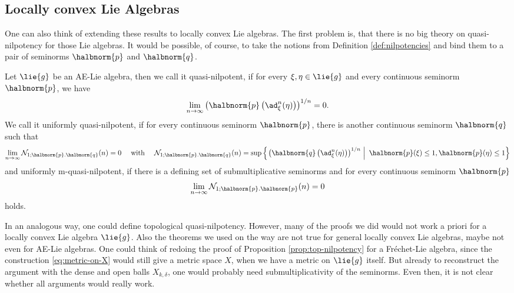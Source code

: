 \documentclass[
11pt,                          %
english                        %
]{article}
\begin{document}
\subsection{Locally convex Lie Algebras}
One can also think of extending these results to locally convex Lie algebras. The 
first problem is, that there is no big theory on quasi-nilpotency for those Lie 
algebras. It would be possible, of course, to take the notions from Definition 
\ref{def:nilpotencies} and bind them to a pair of seminorms $\halbnorm{p}$ and 
$\halbnorm{q}$.
\begin{definition}
	Let $\lie{g}$ be an AE-Lie algebra, then we call it quasi-nilpotent, if for 
	every $\xi, \eta \in \lie{g}$ and every continuous seminorm $\halbnorm{p}$,
	we have
	\begin{equation}
		\lim\limits_{n \rightarrow \infty}
		\left(
			\halbnorm{p}
			\left(
				\ad_\xi^n(\eta)
			\right)
		\right)^{1/n}
		=
		0.
	\end{equation}
	We call it uniformly quasi-nilpotent, if for every continuous seminorm 
	$\halbnorm{p}$, there is another continuous seminorm $\halbnorm{q}$ such that 
	\begin{equation}
		\lim\limits_{n \rightarrow \infty}
		\mathcal{N}_{1; \halbnorm{p}. \halbnorm{q}}(n)
		=
		0
		\quad \text{ with } \quad
		\mathcal{N}_{1; \halbnorm{p}. \halbnorm{q}}(n)
		=
		\sup
		\left\{
		\left.
			\left(
				\halbnorm{q}
				\left( \ad_\xi^n (\eta) \right)	
			\right)^{1/n}
		\ \right| \
			\halbnorm{p}(\xi) \leq 1,
			\halbnorm{p}(\eta) \leq 1
		\right\}
	\end{equation}
	and uniformly m-quasi-nilpotent, if there is a defining set of submultiplicative 
	seminorms and for every continuous seminorm 
	$\halbnorm{p}$
	\begin{equation}
		\lim\limits_{n \rightarrow \infty}
		\mathcal{N}_{1; \halbnorm{p}. \halbnorm{p}}(n)
		=
		0
	\end{equation}
	holds.
\end{definition}
In an analogous way, one could define topological quasi-nilpotency. However, many of 
the proofs we did would not work a priori for a locally convex Lie algebra 
$\lie{g}$. Also the theorems we used on the way are not true for general locally 
convex Lie algebras, maybe not even for AE-Lie algebras. One could think of redoing 
the proof of Proposition \ref{prop:top-nilpotency} for a Fr\'echet-Lie algebra, 
since the construction \eqref{eq:metric-on-X} would still give a metric space $X$, 
when we have a metric on $\lie{g}$ itself. But already to reconstruct the argument 
with the dense and open balls $X_{k, \delta}$, one would probably need 
submultiplicativity of the seminorms. Even then, it is not clear whether all 
arguments would really work.
\end{document}
